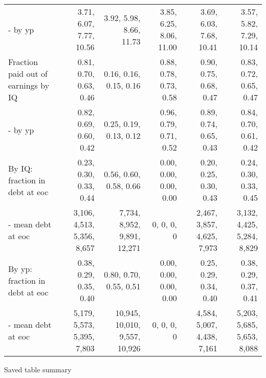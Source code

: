 \begin{tabular}{lrrrrr}
- by yp & 3.71, 6.07, 7.77, 10.56  & 3.92, 5.98, 8.66, 11.73  & 3.85, 6.25, 8.06, 11.00  & 3.69, 6.03, 7.68, 10.41  & 3.57, 5.82, 7.29, 10.14  \\
Fraction paid out of earnings by IQ & 0.81, 0.70, 0.63, 0.46  & 0.16, 0.16, 0.15, 0.16  & 0.88, 0.78, 0.73, 0.58  & 0.90, 0.75, 0.68, 0.47  & 0.83, 0.72, 0.65, 0.47  \\
- by yp & 0.82, 0.69, 0.60, 0.42  & 0.25, 0.19, 0.13, 0.12  & 0.96, 0.79, 0.71, 0.52  & 0.89, 0.74, 0.65, 0.43  & 0.84, 0.70, 0.61, 0.42  \\
By IQ: fraction in debt at eoc & 0.23, 0.30, 0.33, 0.44  & 0.56, 0.60, 0.58, 0.66  & 0.00, 0.00, 0.00, 0.00  & 0.20, 0.25, 0.30, 0.43  & 0.24, 0.30, 0.33, 0.45  \\
- mean debt at eoc & 3,106, 4,513, 5,356, 8,657  & 7,734, 8,952, 9,891, 12,271  & 0, 0, 0, 0  & 2,467, 3,857, 4,625, 7,973  & 3,132, 4,425, 5,284, 8,829  \\
By yp: fraction in debt at eoc & 0.38, 0.29, 0.35, 0.40  & 0.80, 0.70, 0.55, 0.51  & 0.00, 0.00, 0.00, 0.00  & 0.25, 0.29, 0.34, 0.40  & 0.38, 0.29, 0.37, 0.41  \\
- mean debt at eoc & 5,179, 5,573, 5,395, 7,803  & 10,945, 10,010, 9,557, 10,926  & 0, 0, 0, 0  & 4,584, 5,007, 4,438, 7,161  & 5,203, 5,685, 5,653, 8,088  \\
\hline
\end{tabular}%
Saved table summary

